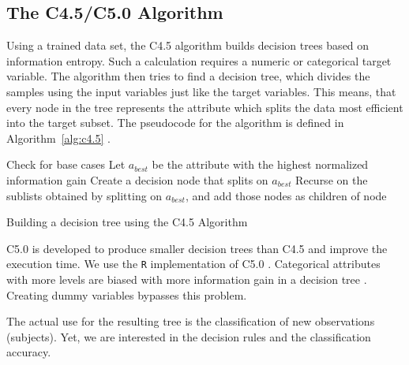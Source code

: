 \documentclass[a4paper,twoside]{style/article}
\begin{document}
\subsection{The C4.5/C5.0 Algorithm}
Using a trained data set, the C4.5 algorithm builds decision trees based on information entropy.
Such a calculation requires a numeric or categorical target variable.
The algorithm then tries to find a decision tree, which divides the samples using the input variables just like the target variables.
This means, that every node in the tree represents the attribute which splits the data most efficient into the target subset.
The pseudocode for the algorithm is defined in Algorithm~\ref{alg:c4.5} \cite{C4.5Algorithm}.
\begin{algorithm}[]
 Check for base cases\;
 Let $a_{best}$ be the attribute with the highest normalized information gain\;
 Create a decision node that splits on $a_{best}$\;
 Recurse on the sublists obtained by splitting on $a_{best}$, and add those nodes as children of node\;
 \caption{Building a decision tree using the C4.5 Algorithm}
 \label{alg:c4.5}
\end{algorithm}
C5.0 is developed to produce smaller decision trees than C4.5 and improve the execution time.
We use the \texttt{R} implementation of C5.0 \cite{c5.0lassification}.
Categorical attributes with more levels are biased with more information gain in a decision tree \cite{deng2011bias}.
Creating dummy variables bypasses this problem.

The actual use for the resulting tree is the classification of new observations (subjects).
Yet, we are interested in the decision rules and the classification accuracy.
\end{document}
